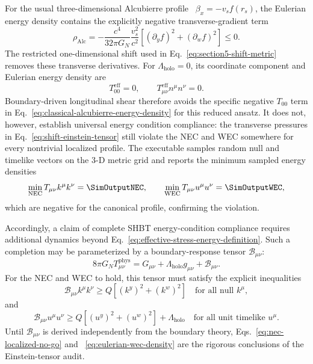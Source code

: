 For the usual three-dimensional Alcubierre profile~\cite{Alcubierre:1994}
\(\beta_x=-v_s f(r_s)\), the Eulerian energy density contains the explicitly
negative transverse-gradient term
\begin{equation}
  \rho_{\mathrm{Alc}}
  =
  -\frac{c^4}{32\pi G_N}
  \frac{v_s^2}{c^2}
  \left[
    (\partial_y f)^2
    +
    (\partial_w f)^2
  \right]
  \leq0.
  \label{eq:classical-alcubierre-energy-density}
\end{equation}
The restricted one-dimensional shift used in
Eq.~\eqref{eq:section5-shift-metric} removes these transverse derivatives.
For \(\Lambda_{\mathrm{holo}}=0\), its coordinate component and Eulerian
energy density are
\begin{equation}
  T_{00}^{\mathrm{eff}}
  =
  0,
  \qquad
  T_{\mu\nu}^{\mathrm{eff}}
  n^\mu n^\nu
  =
  0.
  \label{eq:one-dimensional-zero-eulerian-density}
\end{equation}
Boundary-driven longitudinal shear therefore avoids the specific negative
\(T_{00}\) term in Eq.~\eqref{eq:classical-alcubierre-energy-density} for
this reduced ansatz.  It does not, however, establish universal energy
condition compliance: the transverse pressures in
Eq.~\eqref{eq:shift-einstein-tensor} still violate the NEC and WEC somewhere
for every nontrivial localized profile.  The executable 
samples random null and timelike vectors on the 3-D metric grid and reports the
minimum sampled energy densities
\begin{equation}
  \min_{\text{NEC}} T_{\mu\nu}k^\mu k^\nu = \SimOutputNEC,
  \qquad
  \min_{\text{WEC}} T_{\mu\nu}u^\mu u^\nu = \SimOutputWEC,
  \label{eq:numerical-energy-condition-minima}
\end{equation}
which are negative for the canonical profile, confirming the violation.

Accordingly, a claim of complete SHBT energy-condition compliance requires
additional dynamics beyond
Eq.~\eqref{eq:effective-stress-energy-definition}.  Such a completion may be
parameterized by a boundary-response tensor
\(\mathcal B_{\mu\nu}\):
\begin{equation}
  8\pi G_N
  T_{\mu\nu}^{\mathrm{phys}}
  =
  G_{\mu\nu}
  +
  \Lambda_{\mathrm{holo}}g_{\mu\nu}
  +
  \mathcal B_{\mu\nu}.
  \label{eq:boundary-response-completion}
\end{equation}
For the NEC and WEC to hold, this tensor must satisfy the explicit
inequalities
\begin{equation}
  \mathcal B_{\mu\nu}k^\mu k^\nu
  \geq
  Q
  \left[
    (k^y)^2+(k^w)^2
  \right]
  \quad
  \text{for all null }k^\mu,
  \label{eq:boundary-response-nec-requirement}
\end{equation}
and
\begin{equation}
  \mathcal B_{\mu\nu}u^\mu u^\nu
  \geq
  Q
  \left[
    (u^y)^2+(u^w)^2
  \right]
  +
  \Lambda_{\mathrm{holo}}
  \quad
  \text{for all unit timelike }u^\mu.
  \label{eq:boundary-response-wec-requirement}
\end{equation}
Until \(\mathcal B_{\mu\nu}\) is derived independently from the boundary
theory, Eqs.~\eqref{eq:nec-localized-no-go} and
~\eqref{eq:eulerian-wec-density} are the rigorous conclusions of the
Einstein-tensor audit.